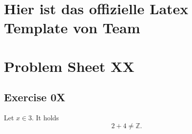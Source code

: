 \documentclass[9pt]{extarticle}
\begin{document}
\section*{Hier ist das offizielle Latex Template von Team }

\hline

\section*{Problem Sheet XX}

\subsection*{Exercise 0X}
Let $x \in 3$. It holds
\[
    2 + 4 \neq \mathbb Z.
\]
\end{document}
